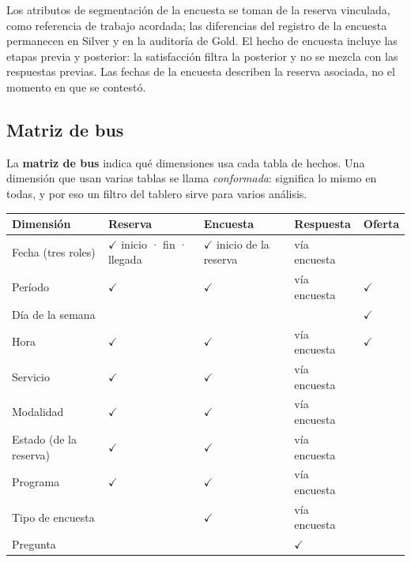 \documentclass[11pt,letterpaper]{article}
\begin{document}
Los atributos de segmentación de la encuesta se toman de la reserva vinculada, como referencia de trabajo acordada; las diferencias del registro de la encuesta permanecen en Silver y en la auditoría de Gold. El hecho de encuesta incluye las etapas previa y posterior: la satisfacción filtra la posterior y no se mezcla con las respuestas previas. Las fechas de la encuesta describen la reserva asociada, no el momento en que se contestó.

\subsection{Matriz de bus}

La \textbf{matriz de bus} indica qué dimensiones usa cada tabla de hechos. Una dimensión que usan varias tablas se llama \emph{conformada}: significa lo mismo en todas, y por eso un filtro del tablero sirve para varios análisis.

\begingroup\small\setlength{\tabcolsep}{4pt}\renewcommand{\arraystretch}{1.15}
\begin{longtable}{>{\raggedright\arraybackslash}p{}>{\centering\arraybackslash}p{}>{\centering\arraybackslash}p{}>{\centering\arraybackslash}p{}>{\centering\arraybackslash}p{}}
\toprule
\textbf{Dimensión} & \textbf{Reserva} & \textbf{Encuesta} & \textbf{Respuesta} & \textbf{Oferta} \\
\midrule
\endhead
Fecha (tres roles) & $\checkmark$ inicio · fin · llegada & $\checkmark$ inicio de la reserva & vía encuesta &  \\
Período & $\checkmark$ & $\checkmark$ & vía encuesta & $\checkmark$ \\
Día de la semana &  &  &  & $\checkmark$ \\
Hora & $\checkmark$ & $\checkmark$ & vía encuesta & $\checkmark$ \\
Servicio & $\checkmark$ & $\checkmark$ & vía encuesta &  \\
Modalidad & $\checkmark$ & $\checkmark$ & vía encuesta &  \\
Estado (de la reserva) & $\checkmark$ & $\checkmark$ & vía encuesta &  \\
Programa & $\checkmark$ & $\checkmark$ & vía encuesta &  \\
Tipo de encuesta &  & $\checkmark$ & vía encuesta &  \\
Pregunta &  &  & $\checkmark$ &  \\
\bottomrule
\end{longtable}
\endgroup
\end{document}
